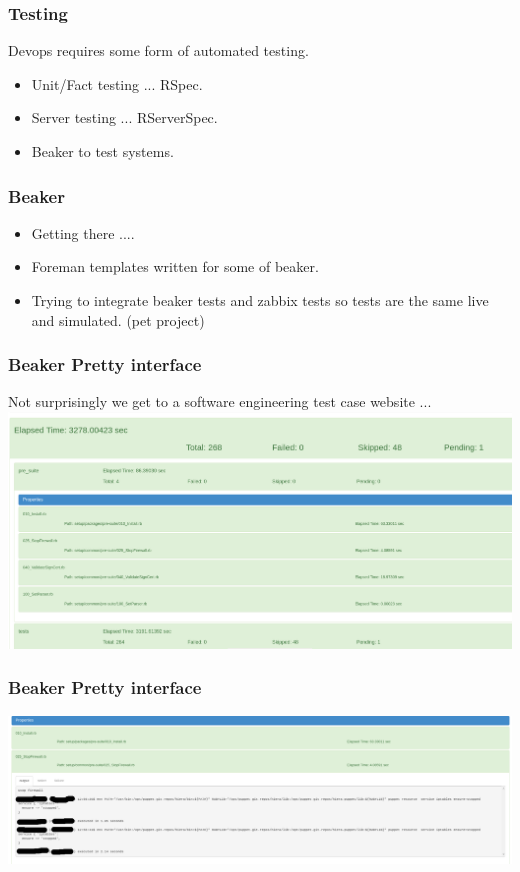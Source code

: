 \documentclass{beamer}
\begin{document}
\begin{frame}
  \frametitle{Testing}
  Devops requires some form of automated testing.
  \begin{itemize}
    \item Unit/Fact testing ... RSpec.
    \item Server testing ... RServerSpec.
        \item Beaker to test systems.
  \end{itemize}
\end{frame}

\begin{frame}
    \frametitle{Beaker}
    \begin{itemize}
        \item Getting there .... \\
        \item Foreman templates written for some of beaker.
        \item Trying to integrate beaker tests and zabbix tests so tests are the same live and simulated. (pet project)
    \end{itemize}
    \end{frame}
\begin{frame}
    \frametitle{Beaker Pretty interface}
    Not surprisingly we get to a software engineering test case website ...\\
    \includegraphics[scale=0.25]{BeakerTest.pdf}
\end{frame}

\begin{frame}
    \frametitle{Beaker Pretty interface}
    \includegraphics[scale=0.25]{BeakerDetail.pdf}
\end{frame}
\end{document}
